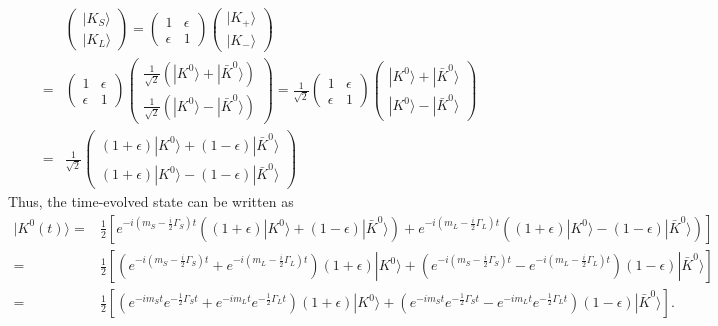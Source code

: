 \begin{align}
    &\begin{pmatrix}
    |K_S\rangle \\
    |K_L\rangle
    \end{pmatrix}= \begin{pmatrix}
    1 & \epsilon \\
    \epsilon & 1
    \end{pmatrix} \begin{pmatrix}
    |K_+\rangle \\
    |K_-\rangle
    \end{pmatrix}\\
    =& \begin{pmatrix}
    1 & \epsilon \\
    \epsilon & 1
    \end{pmatrix} \begin{pmatrix}
    \frac{1}{\sqrt{2}}(|K^0\rangle + |\bar{K}^0\rangle) \\
    \frac{1}{\sqrt{2}}(|K^0\rangle - |\bar{K}^0\rangle)
    \end{pmatrix} = \frac{1}{\sqrt{2}}\begin{pmatrix}
    1 & \epsilon \\
    \epsilon & 1
    \end{pmatrix} \begin{pmatrix}
    |K^0\rangle + |\bar{K}^0\rangle \\
    |K^0\rangle - |\bar{K}^0\rangle
    \end{pmatrix}\\
    =& \frac{1}{\sqrt{2}}\begin{pmatrix}
    (1+\epsilon)|K^0\rangle + (1-\epsilon)|\bar{K}^0\rangle \\
    (1+\epsilon)|K^0\rangle - (1-\epsilon)|\bar{K}^0\rangle
    \end{pmatrix} 
\end{align}
Thus, the time-evolved state can be written as
\begin{align}
    |K^0(t)\rangle =& \frac{1}{2}\left[e^{-i(m_S - \frac{i}{2}\Gamma_S)t}((1+\epsilon)|K^0\rangle + (1-\epsilon)|\bar{K}^0\rangle) + e^{-i(m_L - \frac{i}{2}\Gamma_L)t}((1+\epsilon)|K^0\rangle - (1-\epsilon)|\bar{K}^0\rangle)\right]\\
    =& \frac{1}{2}\left[(e^{-i(m_S - \frac{i}{2}\Gamma_S)t} + e^{-i(m_L - \frac{i}{2}\Gamma_L)t})(1+\epsilon)|K^0\rangle + (e^{-i(m_S - \frac{i}{2}\Gamma_S)t} - e^{-i(m_L - \frac{i}{2}\Gamma_L)t})(1-\epsilon)|\bar{K}^0\rangle\right]\\
    =& \frac{1}{2}\left[(e^{-i m_S t} e^{-\frac{1}{2}\Gamma_S t} + e^{-i m_L t} e^{-\frac{1}{2}\Gamma_L t})(1+\epsilon)|K^0\rangle + (e^{-i m_S t} e^{-\frac{1}{2}\Gamma_S t} - e^{-i m_L t} e^{-\frac{1}{2}\Gamma_L t})(1-\epsilon)|\bar{K}^0\rangle\right].
\end{align}
